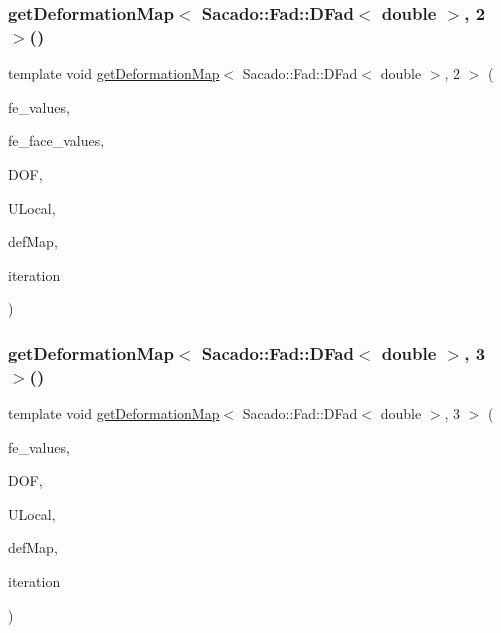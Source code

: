 \subsubsection{\texorpdfstring{get\+Deformation\+Map$<$ Sacado\+::\+Fad\+::\+D\+Fad$<$ double $>$, 2 $>$()}{getDeformationMap< Sacado::Fad::DFad< double >, 2 >()}\hspace{0.1cm}{\footnotesize\ttfamily [2/2]}}
{\footnotesize\ttfamily template void \mbox{\hyperlink{group___evaluation_functions_ga239b206235603af9482484c29c8d57ea}{get\+Deformation\+Map}}$<$ Sacado\+::\+Fad\+::\+D\+Fad$<$ double $>$, 2 $>$ (\begin{DoxyParamCaption}\item[{const F\+E\+Values$<$ 2 $>$ \&}]{fe\+\_\+values,  }\item[{const F\+E\+Face\+Values$<$ 2 $>$ \&}]{fe\+\_\+face\+\_\+values,  }\item[{unsigned int}]{D\+OF,  }\item[{Table$<$ 1, Sacado\+::\+Fad\+::\+D\+Fad$<$ double $>$$>$ \&}]{U\+Local,  }\item[{\mbox{\hyperlink{structdeformation_map}{deformation\+Map}}$<$ Sacado\+::\+Fad\+::\+D\+Fad$<$ double $>$, 2 $>$ \&}]{def\+Map,  }\item[{unsigned int}]{iteration }\end{DoxyParamCaption})}

\mbox{\label{function_evaluations_8cc_aed838368af3e1f968a4234eb18bee8e8}} 
\subsubsection{\texorpdfstring{get\+Deformation\+Map$<$ Sacado\+::\+Fad\+::\+D\+Fad$<$ double $>$, 3 $>$()}{getDeformationMap< Sacado::Fad::DFad< double >, 3 >()}\hspace{0.1cm}{\footnotesize\ttfamily [1/2]}}
{\footnotesize\ttfamily template void \mbox{\hyperlink{group___evaluation_functions_ga239b206235603af9482484c29c8d57ea}{get\+Deformation\+Map}}$<$ Sacado\+::\+Fad\+::\+D\+Fad$<$ double $>$, 3 $>$ (\begin{DoxyParamCaption}\item[{const F\+E\+Values$<$ 3 $>$ \&}]{fe\+\_\+values,  }\item[{unsigned int}]{D\+OF,  }\item[{Table$<$ 1, Sacado\+::\+Fad\+::\+D\+Fad$<$ double $>$$>$ \&}]{U\+Local,  }\item[{\mbox{\hyperlink{structdeformation_map}{deformation\+Map}}$<$ Sacado\+::\+Fad\+::\+D\+Fad$<$ double $>$, 3 $>$ \&}]{def\+Map,  }\item[{unsigned int}]{iteration }\end{DoxyParamCaption})}

